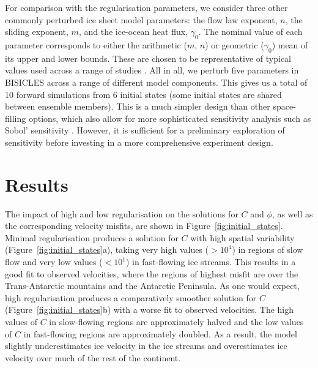 \documentclass[journal abbreviation, manuscript]{copernicus}
\begin{document}
For comparison with the regularisation parameters, we consider three other commonly perturbed ice sheet model parameters: the flow law exponent, $n$, the sliding exponent, $m$, and the ice-ocean heat flux, $\gamma_0$. The nominal value of each parameter corresponds to either the arithmetic ($m$, $n$) or geometric ($\gamma_0$) mean of its upper and lower bounds. These are chosen to be representative of typical values used across a range of studies \citep[e.g.][]{niasAssessingUncertaintyDynamical2019,barnesPredictivePowerIce2022,wolovickRegularizationLcurvesIce2023,seroussiEvolutionAntarcticIce2024,coulonDisentanglingDriversFuture2024,coulonShorttermUncertaintiesLongterm2025,rosierCalibratedSeaLevel2025,getraerIncreasingGlenNye2025}. All in all, we perturb five parameters in BISICLES across a range of different model components. This gives us a total of 10 forward simulations from 6 initial states (some initial states are shared between ensemble members). This is a much simpler design than other space-filling options, which also allow for more sophisticated sensitivity analysis such as Sobol' sensitivity \citep{hillQuantifyingPotentialFuture2021,rosierCalibratedSeaLevel2025}. However, it is sufficient for a preliminary exploration of sensitivity before investing in a more comprehensive experiment design.

\section{Results}

The impact of high and low regularisation on the solutions for $C$ and $\phi$, as well as the corresponding velocity misfits, are shown in Figure~\ref{fig:initial_states}. Minimal regularisation produces a solution for $C$ with high spatial variability (Figure~\ref{fig:initial_states}a), taking very high values ($> 10^4$) in regions of slow flow and very low values ($< 10^1$) in fast-flowing ice streams. This results in a good fit to observed velocities, where the regions of highest misfit are over the Trans-Antarctic mountains and the Antarctic Peninsula. As one would expect, high regularisation produces a comparatively smoother solution for $C$ (Figure~\ref{fig:initial_states}b) with a worse fit to observed velocities. The high values of $C$ in slow-flowing regions are approximately halved and the low values of $C$ in fast-flowing regions are approximately doubled. As a result, the model slightly underestimates ice velocity in the ice streams and overestimates ice velocity over much of the rest of the continent.
\end{document}
